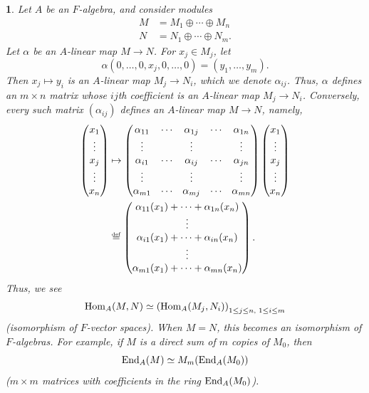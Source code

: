 \documentclass[a4paper,11pt,final,openany]{memoir}%
\newtheorem{plain}[X]{}
\theoremstyle{nonumberplain}
\begin{document}
\begin{plain}
\label{r25}Let $A$ be an $F$-algebra, and consider modules%
\begin{align*}
M  &  =M_{1}\oplus\cdots\oplus M_{n}\\
N  &  =N_{1}\oplus\cdots\oplus N_{m}.
\end{align*}
Let $\alpha$ be an $A$-linear map $M\rightarrow N$. For $x_{j}\in M_{j}$, let%
\[
\alpha(0,\ldots,0,x_{j},0,\ldots,0)=(y_{1},\ldots,y_{m}).
\]
Then $x_{j}\mapsto y_{i}$ is an $A$-linear map $M_{j}\rightarrow N_{i}$, which
we denote $\alpha_{ij}$. Thus, $\alpha$ defines an $m\times n$ matrix whose
$ij$th coefficient is an $A$-linear map $M_{j}\rightarrow N_{i}$. Conversely,
every such matrix $(\alpha_{ij})$ defines an $A$-linear map $M\rightarrow N$,
namely,%
\begin{align*}%
\begin{pmatrix}
x_{1}\\
\vdots\\
x_{j}\\
\vdots\\
x_{n}%
\end{pmatrix}
&\mapsto%
\begin{pmatrix}
\alpha_{11} & \cdots & \alpha_{1j} & \cdots & \alpha_{1n}\\
\vdots &  & \vdots &  & \vdots\\
\alpha_{i1} & \cdots & \alpha_{ij} & \cdots & \alpha_{jn}\\
\vdots &  & \vdots &  & \vdots\\
\alpha_{m1} & \cdots & \alpha_{mj} & \cdots & \alpha_{mn}%
\end{pmatrix}%
\begin{pmatrix}
x_{1}\\
\vdots\\
x_{j}\\
\vdots\\
x_{n}%
\end{pmatrix}\\
&\overset{\df}{=}%
\begin{pmatrix}
\alpha_{11}(x_{1})+\cdots+\alpha_{1n}(x_{n})\\
\vdots\\
\alpha_{i1}(x_{1})+\cdots+\alpha_{in}(x_{n})\\
\vdots\\
\alpha_{m1}(x_{1})+\cdots+\alpha_{mn}(x_{n})
\end{pmatrix}
.
\end{align*}
Thus, we see%
\begin{equation}
\Hom_{A}(M,N)\simeq\left(  \Hom_{A}(M_{j},N_{i})\right)  _{1\leq j\leq
n\text{, }1\leq i\leq m} \label{e22}%
\end{equation}
(isomorphism of $F$-vector spaces). When $M=N$, this becomes an isomorphism of
$F$-algebras. For example, if $M$ is a direct sum of $m$ copies of $M_{0}$,
then%
\begin{equation}
\End_{A}(M)\simeq M_{m}(\End_{A}(M_{0})) \label{e23}%
\end{equation}
($m\times m$ matrices with coefficients in the ring $\operatorname{End}_{A}(M_{0})$).
\end{plain}
\end{document}
